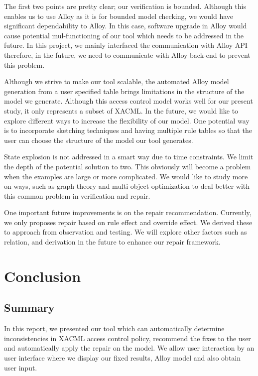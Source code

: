 \documentclass{acm_proc_article-sp}
\begin{document}
The first two points are pretty clear; our verification is bounded. Although this enables us to use Alloy as it is for bounded model checking, we would have significant dependability to Alloy. In this case, software upgrade in Alloy would cause potential mul-functioning of our tool which needs to be addressed in the future. In this project, we mainly interfaced the communication with Alloy API therefore, in the future, we need to communicate with Alloy back-end to prevent this problem.

Although we strive to make our tool scalable, the automated Alloy model generation from a user specified table brings limitations in the structure of the model we generate. Although this access control model works well for our present study, it only represents a subset of XACML. In the future, we would like to explore different ways to increase the flexibility of our model. One potential way is to incorporate sketching techniques and having multiple rule tables so that the user can choose the structure of the model our tool generates.

State explosion is not addressed in a smart way due to time constraints. We limit the depth of the potential solution to two. This obviously will become a problem when the examples are large or more complicated. We would like to study more on ways, such as graph theory and multi-object optimization to deal better with this common problem in verification and repair.

One important future improvements is on the repair recommendation. Currently, we only proposes repair based on rule effect and override effect. We derived these to approach from observation and testing. We will explore other factors such as relation, and derivation in the future to enhance our repair framework.

\section{Conclusion}

\subsection{Summary}
In this report, we presented our tool which can automatically determine inconsistencies in XACML access control policy, recommend the fixes to the user and automatically apply the repair on the model. We allow user interaction by an user interface where we display our fixed results, Alloy model and also obtain user input.
\end{document}
